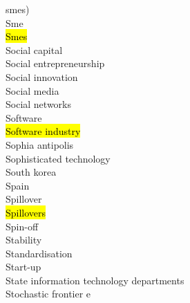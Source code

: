 \documentclass[a4paper]{article}
\begin{document}
\begin{multicols*}{2}
\begin{footnotesize}
smes) \\ Sme \\ \hl{Smes} \\ Social capital \\ Social entrepreneurship \\ Social innovation \\ Social media \\ Social networks \\ Software \\ \hl{Software industry} \\ Sophia antipolis \\ Sophisticated technology \\ South korea \\ Spain \\ Spillover \\ \hl{Spillovers} \\ Spin-off \\ Stability \\ Standardisation \\ Start-up \\ State information technology departments \\ Stochastic frontier e
\end{footnotesize}
\end{multicols*}
\end{document}
